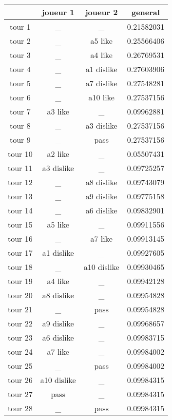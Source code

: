 \documentclass{article}
\begin{document}
\begin{tabular}{|c|c|c|c|}
\hline
& joueur 1 & joueur 2 & general \\
\hline
tour 1 & \_ & \_ & 0.21582031 \\
\hline
tour 2 & \_ & a5 like & 0.25566406 \\
\hline
tour 3 & \_ & a4 like & 0.26769531 \\
\hline
tour 4 & \_ & a1 dislike & 0.27603906 \\
\hline
tour 5 & \_ & a7 dislike & 0.27548281 \\
\hline
tour 6 & \_ & a10 like & 0.27537156 \\
\hline
tour 7 & a3 like & \_ & 0.09962881 \\
\hline
tour 8 & \_ & a3 dislike & 0.27537156 \\
\hline
tour 9 & \_ & pass & 0.27537156 \\
\hline
tour 10 & a2 like & \_ & 0.05507431 \\
\hline
tour 11 & a3 dislike & \_ & 0.09725257 \\
\hline
tour 12 & \_ & a8 dislike & 0.09743079 \\
\hline
tour 13 & \_ & a9 dislike & 0.09775158 \\
\hline
tour 14 & \_ & a6 dislike & 0.09832901 \\
\hline
tour 15 & a5 like & \_ & 0.09911556 \\
\hline
tour 16 & \_ & a7 like & 0.09913145 \\
\hline
tour 17 & a1 dislike & \_ & 0.09927605 \\
\hline
tour 18 & \_ & a10 dislike & 0.09930465 \\
\hline
tour 19 & a4 like & \_ & 0.09942128 \\
\hline
tour 20 & a8 dislike & \_ & 0.09954828 \\
\hline
tour 21 & \_ & pass & 0.09954828 \\
\hline
tour 22 & a9 dislike & \_ & 0.09968657 \\
\hline
tour 23 & a6 dislike & \_ & 0.09983715 \\
\hline
tour 24 & a7 like & \_ & 0.09984002 \\
\hline
tour 25 & \_ & pass & 0.09984002 \\
\hline
tour 26 & a10 dislike & \_ & 0.09984315 \\
\hline
tour 27 & pass & \_ & 0.09984315 \\
\hline
tour 28 & \_ & pass & 0.09984315 \\
\hline
\end{tabular}
\end{document}
